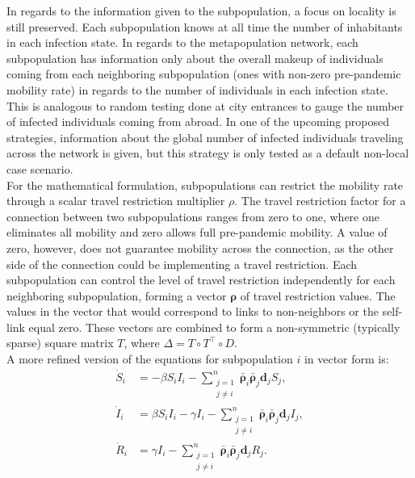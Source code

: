 In regards to the information given to the subpopulation, a focus on locality is still preserved. Each subpopulation knows at all time the number of inhabitants in each infection state. In regards to the metapopulation network, each subpopulation has information only about the overall makeup of individuals coming from each neighboring subpopulation (ones with non-zero pre-pandemic mobility rate) in regards to the number of individuals in each infection state. This is analogous to random testing done at city entrances to gauge the number of infected individuals coming from abroad. In one of the upcoming proposed strategies, information about the global number of infected individuals traveling across the network is given, but this strategy is only tested as a default non-local case scenario.\\

For the mathematical formulation, subpopulations can restrict the mobility rate through a scalar travel restriction multiplier $\rho$. The travel restriction factor for a connection between two subpopulations ranges from zero to one, where one eliminates all mobility and zero allows full pre-pandemic mobility. A value of zero, however, does not guarantee mobility across the connection, as the other side of the connection could be implementing a travel restriction. Each subpopulation can control the level of travel restriction independently for each neighboring subpopulation, forming a vector $\mathbf{\rho}$ of travel restriction values. The values in the vector that would correspond to links to non-neighbors or the self-link equal zero. These vectors are combined to form a non-symmetric (typically sparse) square matrix $T$, where $\Delta = T \circ T^\top \circ D$.\\

A more refined version of the equations for subpopulation $i$ in vector form is:
\begin{equation}    
\begin{aligned}
        \dot{S}_{i} &= -\beta S_{i} I_{i} - \sum_{\substack{j=1 \\ j \neq i}}^n \mathbf{\bar \rho}_i \mathbf{\bar \rho}_j \mathbf{d}_j S_j, \\
        \dot{I}_{i} &= \beta S_{i} I_{i} - \gamma I_{i} - \sum_{\substack{j=1 \\ j \neq i}}^n \mathbf{\bar \rho}_i \mathbf{\bar \rho}_j \mathbf{d}_j I_j, \\
        \dot{R}_{i} &= \gamma I_{i} - \sum_{\substack{j=1 \\ j \neq i}}^n \mathbf{\bar \rho}_i \mathbf{\bar \rho}_j \mathbf{d}_j R_j.
\end{aligned}
\end{equation}

